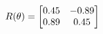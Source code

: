 \documentclass[preview]{standalone}
\begin{document}
\begin{align*}
\special{dvisvgm:raw <g id='unique000'>}R(\theta) = \begin{bmatrix}0.45 & -0.89\\0.89 & 0.45\end{bmatrix}\special{dvisvgm:raw </g>}
\end{align*}
\end{document}
